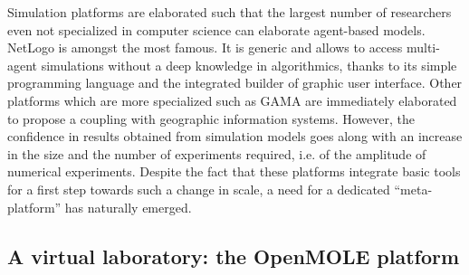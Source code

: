 \documentclass[10pt]{article}
\begin{document}
Simulation platforms are elaborated such that the largest number of researchers even not specialized in computer science can elaborate agent-based models. NetLogo \citep{tisue2004netlogo} is amongst the most famous. It is generic and allows to access multi-agent simulations without a deep knowledge in algorithmics, thanks to its simple programming language and the integrated builder of graphic user interface. Other platforms which are more specialized such as GAMA \citep{grignard2013gama} are immediately elaborated to propose a coupling with geographic information systems. However, the confidence in results obtained from simulation models goes along with an increase in the size and the number of experiments required, i.e. of the amplitude of numerical experiments. Despite the fact that these platforms integrate basic tools for a first step towards such a change in scale, a need for a dedicated ``meta-platform'' has naturally emerged.



\subsection{A virtual laboratory: the OpenMOLE platform}
\end{document}
